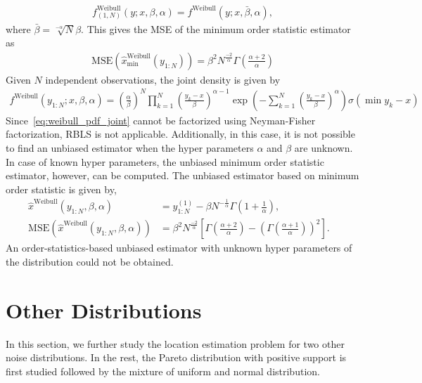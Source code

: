\documentclass{article}
\newcommand{\MSE}{\mathrm{MSE}}
\begin{document}
%
%
\begin{align}
f^{\mathrm{Weibull}}_{(1,N)}(y;x,\beta,\alpha) = f^{\mathrm{Weibull}}(y;x,\bar{\beta},\alpha),
\end{align}
%
%
where $\bar{\beta}=\sqrt[-\alpha]{N}\beta$. This gives the MSE of the minimum order statistic estimator as
%
%
\begin{align}
\MSE(\hat{x}_{\mathrm{min}}^{\mathrm{Weibull}}(y_{1:N})) = \beta^2N^{\frac{-2}{\alpha}}\Gamma(\frac{\alpha+2}{\alpha})
\end{align}
%
%
Given $N$ independent observations, the joint density is given by
%
%
	\begin{align}
f^{\mathrm{Weibull}}(y_{1:N};x,\beta,\alpha)=(\frac{\alpha}{\beta})^N\prod_{k=1}^{N}\left(\frac{y_k-x}{\beta}\right)^{\alpha-1}\exp(-\sum_{k=1}^{N}(\frac{y_k-x}{\beta})^\alpha)\sigma(\min y_k - x)
\label{eq:weibull_pdf_joint}
\end{align}
%
%
Since~\eqref{eq:weibull_pdf_joint} cannot be factorized using Neyman-Fisher factorization, RBLS is not applicable. Additionally, in this case, it is not possible to find an unbiased estimator when the hyper parameters $\alpha$ and $\beta$ are unknown. In case of known hyper parameters, the unbiased minimum order statistic estimator, however, can be computed.  The unbiased estimator based on minimum order statistic is given by,
%
%
	\begin{align}
	\hat{x}^{\mathrm{Weibull}}(y_{1:N},\beta,\alpha) &= y^{(1)}_{1:N}- \beta N^{-\frac{1}{\alpha}}\Gamma(1+\frac{1}{\alpha}),
	&\nonumber\\ 
	\MSE(\hat{x}^{\mathrm{Weibull}}(y_{1:N},\beta,\alpha)) &=\beta^2N^{\frac{-2}{\alpha}}\left[\Gamma(\frac{\alpha+2}{\alpha})-\left(\Gamma(\frac{\alpha+1}{\alpha})\right)^2\right].
	\end{align}
%
%
An order-statistics-based unbiased estimator with unknown hyper parameters of the distribution could not be obtained.
\section{Other Distributions}\label{sec:other_distributions}
In this section, we further study the location estimation problem for two other noise distributions. In the rest, the Pareto distribution with positive support is first studied followed by the mixture of uniform and normal distribution.
\end{document}
